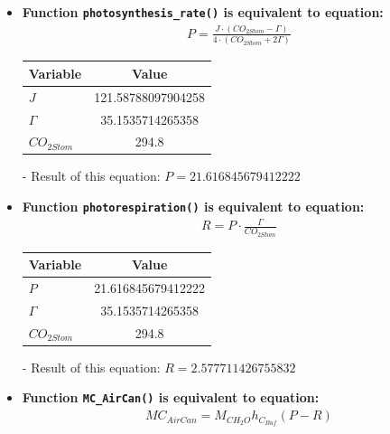 \documentclass[a4paper]{article}
\numberwithin{equation}{section}
\begin{document}
\begin{itemize}
  \item \textbf{Function \texttt{photosynthesis\_rate()} is equivalent to equation:}
        \begin{align*}
          P = \frac{J \cdot (CO_{2Stom} - \Gamma)}{4 \cdot (CO_{2Stom} + 2\Gamma)}
        \end{align*}

        \begin{table}[H]
          \centering
          \begin{tabular}{@{}lS[table-format=3.15]@{}}
            \toprule
            \textbf{Variable} & \textbf{Value}     \\
            \midrule
            \( J \)             & 121.58788097904258 \\
            \( \Gamma \)        & 35.1535714265358   \\
            \( CO_{2Stom} \)    & 294.8              \\
            \bottomrule
          \end{tabular}
        \end{table}

  \item[-] Result of this equation: \( P = 21.616845679412222 \)

  \item \textbf{Function \texttt{photorespiration()} is equivalent to equation:}
        \begin{align*}
          R = P \cdot \frac{\Gamma}{CO_{2Stom}}
        \end{align*}

        \begin{table}[H]
          \centering
          \begin{tabular}{@{}lS[table-format=3.15]@{}}
            \toprule
            \textbf{Variable} & \textbf{Value}     \\
            \midrule
            \( P \)             & 21.616845679412222 \\
            \( \Gamma \)        & 35.1535714265358   \\
            \( CO_{2Stom} \)    & 294.8              \\
            \bottomrule
          \end{tabular}
        \end{table}

  \item[-] Result of this equation: \( R = 2.577711426755832 \)

  \item \textbf{Function \texttt{MC\_AirCan()} is equivalent to equation:}
        \begin{align*}
          MC_{AirCan} = M_{CH_2O} h_{C_{Buf}} (P - R)
        \end{align*}


\end{itemize}
\end{document}
